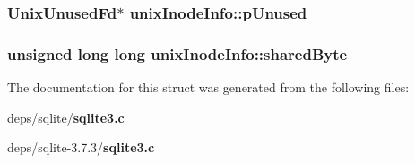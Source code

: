 \subsubsection{\setlength{\rightskip}{0pt plus 5cm}\bf{Unix\-Unused\-Fd}$\ast$ \bf{unix\-Inode\-Info::p\-Unused}}\label{structunixInodeInfo_8e671d27b26371dee9466a874795ea7e}


\subsubsection{\setlength{\rightskip}{0pt plus 5cm}unsigned long long \bf{unix\-Inode\-Info::shared\-Byte}}\label{structunixInodeInfo_e3d31d4c5e4c37bc3a6539710473b2e9}




The documentation for this struct was generated from the following files:\begin{CompactItemize}
\item 
deps/sqlite/\bf{sqlite3.c}\item 
deps/sqlite-3.7.3/\bf{sqlite3.c}\end{CompactItemize}
